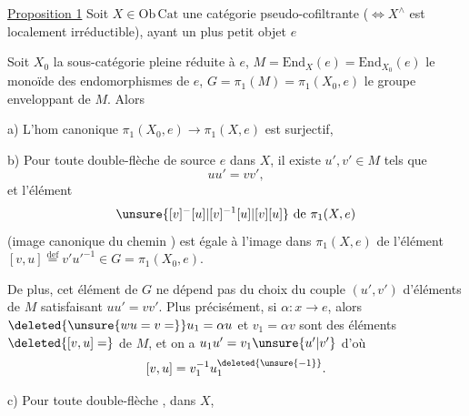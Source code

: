 
\uline{Proposition 1} Soit $X\in\mathrm{Ob}\,\mathrm{Cat}$  une catégorie pseudo-cofiltrante ($\Longleftrightarrow X^\wedge$ est localement irréductible), ayant un plus petit objet $e$

Soit $X_0$ la sous-catégorie pleine réduite à $e$, $M=\mathrm{End}_X(e)=\mathrm{End}_{X_0}(e)$ le monoïde des endomorphismes de $e$, $G=\pi_1(M)=\pi_1(X_0,e)$ le groupe enveloppant de $M$. Alors

a) L'hom canonique $\pi_1(X_0,e)\longrightarrow\pi_1(X,e)$ est surjectif, 

b) Pour toute double-flèche de source $e$
dans $X$, il existe $u',v'\in M$ tels que
\[
uu'=vv',
\]
et l'élément
\[
\unsure{[v]^{-}[u]|[v]^{-1}[u]|[v][u]}\ \text{de}\ \pi_1(X,e)
\]
(image canonique du chemin )
est égale à l'image dans $\pi_1(X,e)$ de l'élément $[v,u]\overset{\mathrm{def}}{=}v'u'^{-1}\in G=\pi_1(X_0,e)$.

De plus,  cet élément \inserted{$[v,u]$} de $G$ ne dépend pas du choix du couple $(u',v')$ d'éléments de $M$ satisfaisant $uu'=vv'$. Plus précisément, si $\alpha:x\longrightarrow e$, alors $\deleted{\unsure{w u=v=}}u_1=\alpha u$ et $v_1=\alpha v$ sont des éléments $\deleted{[v,u]=}$ de $M$, et on a $u_1u'=v_1\unsure{u'|v'}$ d'où
\[
[v,u]=v_1^{-1}u_1^{\deleted{\unsure{-1}}}.
\]

c) Pour toute double-flèche , dans $X$,

